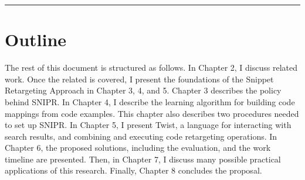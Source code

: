 \fancybreak{\pfbreakdisplay}

\section{Outline}
\label{sec:outline}

The rest of this document is structured as follows. In Chapter 2, I discuss related work.
Once the related is covered, I present the foundations of the Snippet Retargeting Approach in Chapter 3, 4, and 5. Chapter 3 describes the policy behind \uppercase{SnipR}. In Chapter 4, I describe the learning algorithm for building code mappings from code examples. This chapter also describes two procedures needed to set up \uppercase{SnipR}. In Chapter 5, I present Twist, a language for interacting with search results, and combining
and executing code retargeting operations. In Chapter 6, the proposed solutions, including the evaluation, and the work timeline are presented. Then, in Chapter 7, I discuss many possible practical applications of this research. Finally, Chapter 8 concludes the proposal.
